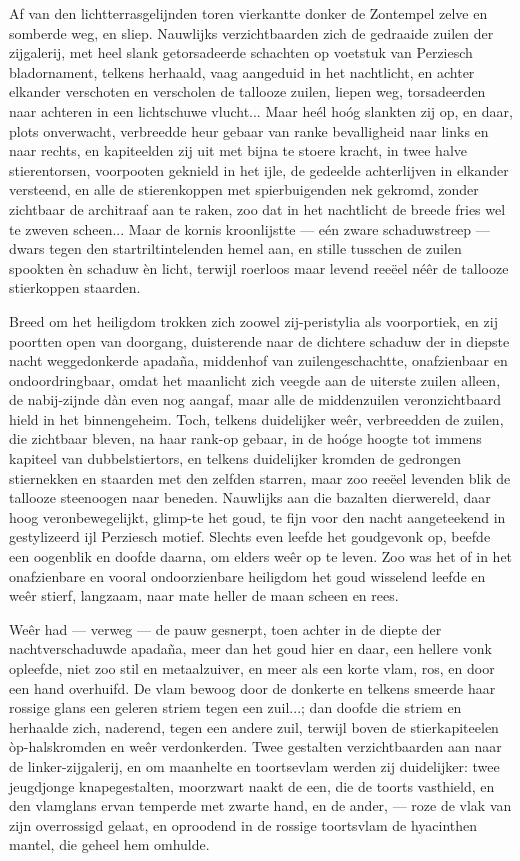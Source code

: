 \documentclass[a4paper, 12pt, oneside, dutch]{article}
\begin{document}
Af van den lichtterrasgelijnden toren vierkantte donker de Zontempel zelve en somberde weg, en sliep. Nauwlijks verzichtbaarden zich de gedraaide zuilen der zijgalerij, met heel slank getorsadeerde schachten op voetstuk van Perziesch bladornament, telkens herhaald, vaag aangeduid in het nachtlicht, en achter elkander verschoten en verscholen de tallooze zuilen, liepen weg, torsadeerden naar achteren in een lichtschuwe vlucht... Maar heél hoóg slankten zij op, en daar, plots onverwacht, verbreedde heur gebaar van ranke bevalligheid naar links en naar rechts, en kapiteelden zij uit met bijna te stoere kracht, in twee halve stierentorsen, voorpooten geknield in het ijle, de gedeelde achterlijven in elkander versteend, en alle de stierenkoppen met spierbuigenden nek gekromd, zonder zichtbaar de architraaf aan te raken, zoo dat in het nachtlicht de breede fries wel te zweven scheen... Maar de kornis kroonlijstte --- eén zware schaduwstreep --- dwars tegen den startriltintelenden hemel aan, en stille tusschen de zuilen spookten èn schaduw èn licht, terwijl roerloos maar levend reeëel néêr de tallooze stierkoppen staarden.

Breed om het heiligdom trokken zich zoowel zij-peristylia als voorportiek, en zij poortten open van doorgang, duisterende naar de dichtere schaduw der in diepste nacht weggedonkerde apadaña, middenhof van zuilengeschachtte, onafzienbaar en ondoordringbaar, omdat het maanlicht zich veegde aan de uiterste zuilen alleen, de nabij-zijnde dàn even nog aangaf, maar alle de middenzuilen veronzichtbaard hield in het binnengeheim. Toch, telkens duidelijker weêr, verbreedden de zuilen, die zichtbaar bleven, na haar rank-op gebaar, in de hoóge hoogte tot immens kapiteel van dubbelstiertors, en telkens duidelijker kromden de gedrongen stiernekken en staarden met den zelfden starren, maar zoo reeëel levenden blik de tallooze steenoogen naar beneden. Nauwlijks aan die bazalten dierwereld, daar hoog veronbewegelijkt, glimp-te het goud, te fijn voor den nacht aangeteekend in gestylizeerd ijl Perziesch motief. Slechts even leefde het goudgevonk op, beefde een oogenblik en doofde daarna, om elders weêr op te leven. Zoo was het of in het onafzienbare en vooral ondoorzienbare heiligdom het goud wisselend leefde en weêr stierf, langzaam, naar mate heller de maan scheen en rees.

Weêr had --- verweg --- de pauw gesnerpt, toen achter in de diepte der nachtverschaduwde apadaña, meer dan het goud hier en daar, een hellere vonk opleefde, niet zoo stil en metaalzuiver, en meer als een korte vlam, ros, en door een hand overhuifd. De vlam bewoog door de donkerte en telkens smeerde haar rossige glans een geleren striem tegen een zuil...; dan doofde die striem en herhaalde zich, naderend, tegen een andere zuil, terwijl boven de stierkapiteelen òp-halskromden en weêr verdonkerden. Twee gestalten verzichtbaarden aan naar de linker-zijgalerij, en om maanhelte en toortsevlam werden zij duidelijker: twee jeugdjonge knapegestalten, moorzwart naakt de een, die de toorts vasthield, en den vlamglans ervan temperde met zwarte hand, en de ander, --- roze de vlak van zijn overrossigd gelaat, en oproodend in de rossige toortsvlam de hyacinthen mantel, die geheel hem omhulde.
\end{document}
